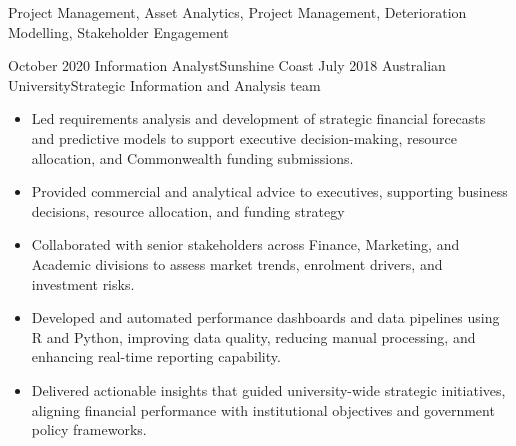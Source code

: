 \begin{experiences}
{\begin{itemize}
                      \end{itemize}
                    }
                    {Project Management, Asset Analytics, Project Management, Deterioration Modelling, Stakeholder Engagement}
  \emptySeparator     

  \consultantexperience
    {October 2020}   {Information Analyst}{}{Sunshine Coast}
    {July 2018}  {Australian University}{Strategic Information and Analysis team}
    {
                      \begin{itemize}
		\item Led requirements analysis and development of strategic financial forecasts and predictive models to support executive decision-making, resource allocation, and Commonwealth funding submissions.
		\item Provided commercial and analytical advice to executives, supporting business decisions, resource allocation, and funding strategy
		\item Collaborated with senior stakeholders across Finance, Marketing, and Academic divisions to assess market trends, enrolment drivers, and investment risks.
		\item Developed and automated performance dashboards and data pipelines using R and Python, improving data quality, reducing manual processing, and enhancing real-time reporting capability.
		\item Delivered actionable insights that guided university-wide strategic initiatives, aligning financial performance with institutional objectives and government policy frameworks.
		                                                           

\end{itemize}}
\end{experiences}
